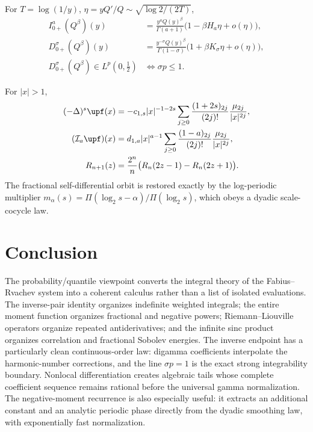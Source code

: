 \documentclass[11pt,oneside]{article}
\theoremstyle{definition}
\theoremstyle{remark}
\newcommand{\Q}{Q}
\newcommand{\1}{\mathbf 1}
\begin{document}
\begin{resultbox}
For \(T=\log(1/y)\), \(\eta=y\Q'/\Q\sim\sqrt{\log2/(2T)}\),
\begin{align*}
 I_{0+}^{a}(\Q^\beta)(y)
 &=\frac{y^a\Q(y)^\beta}{\Gamma(a+1)}
   \bigl(1-\beta H_a\eta+o(\eta)\bigr),\\
 D_{0+}^{\sigma}(\Q^\beta)(y)
 &=\frac{y^{-\sigma}\Q(y)^\beta}{\Gamma(1-\sigma)}
   \bigl(1+\beta K_\sigma\eta+o(\eta)\bigr),\\
 D_{0+}^{\sigma}(\Q^\beta)\in L^p(0,\tfrac12)
 &\Longleftrightarrow \sigma p\le1.
\end{align*}
\end{resultbox}

\begin{resultbox}
For \(|x|>1\),
\begin{align*}
 (-\Delta)^s\upf(x)
 &=-c_{1,s}|x|^{-1-2s}
   \sum_{j\ge0}\frac{(1+2s)_{2j}}{(2j)!}
   \frac{\mu_{2j}}{|x|^{2j}},\\
 (\mathcal I_a\upf)(x)
 &=d_{1,a}|x|^{a-1}
   \sum_{j\ge0}\frac{(1-a)_{2j}}{(2j)!}
   \frac{\mu_{2j}}{|x|^{2j}},\\
 R_{n+1}(z)
 &=\frac{2^n}{n}\bigl(R_n(2z-1)-R_n(2z+1)\bigr).
\end{align*}
The fractional self-differential orbit is restored exactly by the log-periodic multiplier
\(
 m_\alpha(s)=\Pi(\log_2s-\alpha)/\Pi(\log_2s)
\), which obeys a dyadic scale-cocycle law.
\end{resultbox}


\section{Conclusion}

The probability/quantile viewpoint converts the integral theory of the Fabius--Rvachev
system into a coherent calculus rather than a list of isolated evaluations.  The
inverse-pair identity organizes indefinite weighted integrals; the entire moment function
organizes fractional and negative powers; Riemann--Liouville operators organize repeated
antiderivatives; and the infinite sinc product organizes correlation and fractional
Sobolev energies.  The inverse endpoint has a particularly clean continuous-order law:
digamma coefficients interpolate the harmonic-number corrections, and the line
\(\sigma p=1\) is the exact strong integrability boundary.  Nonlocal differentiation
creates algebraic tails whose complete coefficient sequence remains rational before the
universal gamma normalization.  The negative-moment recurrence is also especially
useful: it extracts an additional constant and an analytic periodic phase directly from
the dyadic smoothing law, with exponentially fast normalization.
\end{document}
